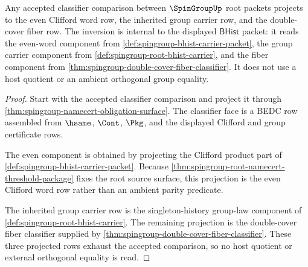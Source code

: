\begin{theorem}
\label{thm:spingroup-root-even-word-classifier-inversion}
Any accepted classifier comparison between $\SpinGroupUp$ root packets projects
to the even Clifford word row, the inherited group carrier row, and the
double-cover fiber row. The inversion is internal to the displayed
$\mathsf{BHist}$ packet: it reads the even-word component from
\autoref{def:spingroup-bhist-carrier-packet}, the group carrier component from
\autoref{def:spingroup-root-bhist-carrier}, and the fiber component from
\autoref{thm:spingroup-double-cover-fiber-classifier}. It does not use a host
quotient or an ambient orthogonal group equality.
\end{theorem}
\begin{proof}
Start with the accepted classifier comparison and project it through
\autoref{thm:spingroup-namecert-obligation-surface}. The classifier face is a
BEDC row assembled from $\hsame$, $\Cont$, $\Pkg$, and the displayed Clifford
and group certificate rows.

The even component is obtained by projecting the Clifford product part of
\autoref{def:spingroup-bhist-carrier-packet}. Because
\autoref{thm:spingroup-root-namecert-threshold-package} fixes the root source
surface, this projection is the even Clifford word row rather than an ambient
parity predicate.

The inherited group carrier row is the singleton-history group-law component
of \autoref{def:spingroup-root-bhist-carrier}. The remaining projection is the
double-cover fiber classifier supplied by
\autoref{thm:spingroup-double-cover-fiber-classifier}. These three projected
rows exhaust the accepted comparison, so no host quotient or external
orthogonal equality is read.
\end{proof}




